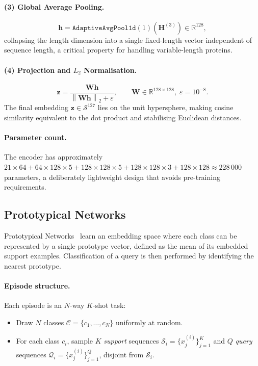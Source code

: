 \documentclass[11pt,a4paper]{article}
\newcommand{\R}{\mathbb{R}}
\newcommand{\norm}[1]{\left\| #1 \right\|}
\newcommand{\vect}[1]{\mathbf{#1}}
\newcommand{\mat}[1]{\mathbf{#1}}
\begin{document}
\paragraph{(3) Global Average Pooling.}
\[
  \vect{h} = \texttt{AdaptiveAvgPool1d}(1)\!\left(\mat{H}^{(3)}\right) \in \R^{128},
\]
collapsing the length dimension into a single fixed-length vector independent of
sequence length, a critical property for handling variable-length proteins.

\paragraph{(4) Projection and $L_2$ Normalisation.}
\[
  \vect{z} = \frac{\mat{W} \vect{h}}{\norm{\mat{W} \vect{h}}_2 + \varepsilon},
  \qquad \mat{W} \in \R^{128 \times 128},\; \varepsilon = 10^{-8}.
\]
The final embedding $\vect{z} \in \mathcal{S}^{127}$ lies on the unit
hypersphere, making cosine similarity equivalent to the dot product and
stabilising Euclidean distances.

\paragraph{Parameter count.}
The encoder has approximately $21 \times 64 + 64 \times 128 \times 5 +
128 \times 128 \times 5 + 128 \times 128 \times 3 + 128 \times 128 \approx
228\,000$ parameters, a deliberately lightweight design that avoids
pre-training requirements.

\subsection{Prototypical Networks}
\label{sec:protonet}

Prototypical Networks~\cite{snell2017prototypical} learn an embedding space where
each class can be represented by a single prototype vector, defined as the mean
of its embedded support examples.  Classification of a query is then performed by
identifying the nearest prototype.

\paragraph{Episode structure.}
Each episode is an $N$-way $K$-shot task:
\begin{itemize}[noitemsep]
  \item Draw $N$ classes $\mathcal{C} = \{c_1,\ldots,c_N\}$ uniformly at random.
  \item For each class $c_i$, sample $K$ \emph{support} sequences
        $\mathcal{S}_i = \{x_j^{(i)}\}_{j=1}^K$ and $Q$ \emph{query} sequences
        $\mathcal{Q}_i = \{x_j^{(i)}\}_{j=1}^Q$, disjoint from $\mathcal{S}_i$.
\end{itemize}
\end{document}
